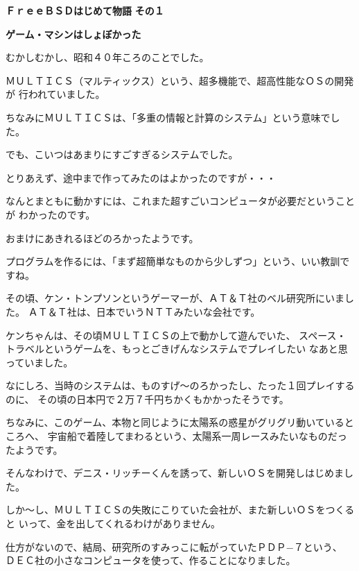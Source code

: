 \documentclass[12pt]{jarticle}
\begin{document}
\setlength{\baselineskip}{6mm}
\noindent
\textbf{\Huge ＦｒｅｅＢＳＤはじめて物語}
\hspace{1cm}
\textbf{\LARGE その１}

\bigskip

\textbf{\large ゲーム・マシンはしょぼかった}

\bigskip
\bigskip

むかしむかし、昭和４０年ころのことでした。

ＭＵＬＴＩＣＳ（マルティックス）という、超多機能で、超高性能なＯＳの開発が
行われていました。

ちなみにＭＵＬＴＩＣＳは、「多重の情報と計算のシステム」という意味でした。

\medskip

でも、こいつはあまりにすごすぎるシステムでした。

とりあえず、途中まで作ってみたのはよかったのですが・・・

なんとまともに動かすには、これまた超すごいコンピュータが必要だということが
わかったのです。

おまけにあきれるほどのろかったようです。

\bigskip

プログラムを作るには、「まず超簡単なものから少しずつ」という、いい教訓ですね。

\bigskip

その頃、ケン・トンプソンというゲーマーが、ＡＴ＆Ｔ社のベル研究所にいました。
ＡＴ＆Ｔ社は、日本でいうＮＴＴみたいな会社です。

ケンちゃんは、その頃ＭＵＬＴＩＣＳの上で動かして遊んでいた、
スペース・トラベルというゲームを、もっとごきげんなシステムでプレイしたい
なあと思っていました。

なにしろ、当時のシステムは、ものすげ〜のろかったし、たった１回プレイするのに、
その頃の日本円で２万７千円ちかくもかかったそうです。

ちなみに、このゲーム、本物と同じように太陽系の惑星がグリグリ動いているところへ、
宇宙船で着陸してまわるという、太陽系一周レースみたいなものだったようです。

\bigskip

そんなわけで、デニス・リッチーくんを誘って、新しいＯＳを開発しはじめました。

しか〜し、ＭＵＬＴＩＣＳの失敗にこりていた会社が、また新しいＯＳをつくると
いって、金を出してくれるわけがありません。

仕方がないので、結局、研究所のすみっこに転がっていたＰＤＰ−７という、
ＤＥＣ社の小さなコンピュータを使って、作ることになりました。
\end{document}
